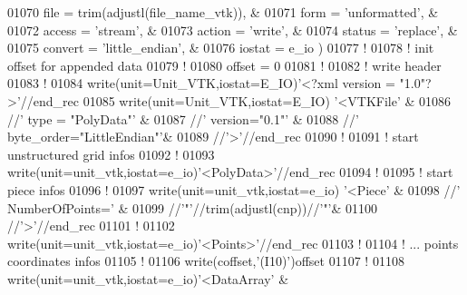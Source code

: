 \begin{DoxyCode}
01070      file       = trim(adjustl(file\_name\_vtk)), &
01071      form       = \textcolor{stringliteral}{'unformatted'},                &
01072      access     = \textcolor{stringliteral}{'stream'},                     &
01073      action     = \textcolor{stringliteral}{'write'},                      &
01074      status     = \textcolor{stringliteral}{'replace'},                    &
01075      convert    = \textcolor{stringliteral}{'little\_endian'},              &
01076      iostat     = e\_io                          )
01077 \textcolor{comment}{!}
01078 \textcolor{comment}{! init offset for appended data}
01079 \textcolor{comment}{!}
01080 offset = 0
01081 \textcolor{comment}{!}
01082 \textcolor{comment}{! write header}
01083 \textcolor{comment}{!}
01084 \textcolor{keyword}{write}(unit=Unit\_VTK,iostat=E\_IO)\textcolor{stringliteral}{'<?xml version = "1.0"?>'}//end\_rec
01085 \textcolor{keyword}{write}(unit=Unit\_VTK,iostat=E\_IO)  \textcolor{stringliteral}{'<VTKFile'}                  &
01086                                 //\textcolor{stringliteral}{' type = "PolyData"'}        &
01087                                 //\textcolor{stringliteral}{' version="0.1"'}            &
01088                                 //\textcolor{stringliteral}{' byte\_order="LittleEndian"'}&
01089                                 //\textcolor{stringliteral}{'>'}//end\_rec
01090 \textcolor{comment}{!}
01091 \textcolor{comment}{! start unstructured grid infos}
01092 \textcolor{comment}{!}
01093 \textcolor{keyword}{write}(unit=unit\_vtk,iostat=e\_io)\textcolor{stringliteral}{'<PolyData>'}//end\_rec
01094 \textcolor{comment}{!}
01095 \textcolor{comment}{! start piece infos}
01096 \textcolor{comment}{!}
01097 \textcolor{keyword}{write}(unit=unit\_vtk,iostat=e\_io)  \textcolor{stringliteral}{'<Piece'}                    &
01098                                 //\textcolor{stringliteral}{' NumberOfPoints='}          &
01099                                 //\textcolor{stringliteral}{'"'}//trim(adjustl(cnp))//\textcolor{stringliteral}{'"'}&
01100                                 //\textcolor{stringliteral}{'>'}//end\_rec
01101 \textcolor{comment}{!}
01102 \textcolor{keyword}{write}(unit=unit\_vtk,iostat=e\_io)\textcolor{stringliteral}{'<Points>'}//end\_rec
01103 \textcolor{comment}{!}
01104 \textcolor{comment}{! ... points coordinates infos}
01105 \textcolor{comment}{!}
01106 \textcolor{keyword}{write}(coffset,\textcolor{stringliteral}{'(I10)'})offset
01107 \textcolor{comment}{!}
01108 \textcolor{keyword}{write}(unit=unit\_vtk,iostat=e\_io)\textcolor{stringliteral}{'<DataArray'}                      &

\end{DoxyCode}
